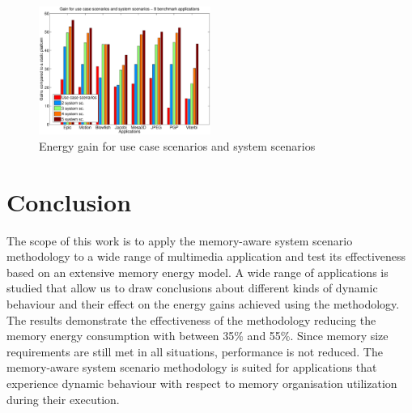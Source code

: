 \documentclass[a4paper,conference]{IEEEtran}
\begin{document}
\begin{figure}[!t]
\centering
\includegraphics[width=0.50\textwidth]{Images/usecase.eps}
\caption{Energy gain for use case scenarios and system scenarios}
\label{fig:usecase}
\end{figure}

\section{Conclusion}
\label{sec:conclusion}

The scope of this work is to apply the memory-aware system scenario methodology to a wide range of multimedia application and test its effectiveness based on an extensive memory energy model. A wide range of applications is studied that allow us to draw conclusions about different kinds of dynamic behaviour and their effect on the energy gains achieved using the methodology. The results demonstrate the effectiveness of the methodology reducing the memory energy consumption with between 35\% and 55\%. Since memory size requirements are still met in all situations, performance is not reduced. The memory-aware system scenario methodology is suited for applications that experience dynamic behaviour with respect to memory organisation utilization during their execution.



\end{document}
